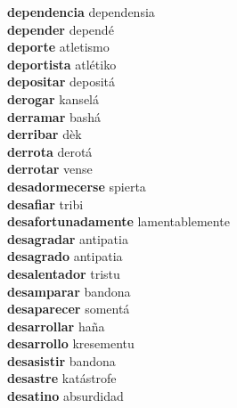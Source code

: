\textbf{dependencia } dependensia \\
\textbf{depender } dependé \\
\textbf{deporte } atletismo \\
\textbf{deportista } atlétiko \\
\textbf{depositar } depositá \\
\textbf{derogar } kanselá \\
\textbf{derramar } bashá \\
\textbf{derribar } dèk \\
\textbf{derrota } derotá \\
\textbf{derrotar } vense \\
\textbf{desadormecerse } spierta \\
\textbf{desafiar } tribi \\
\textbf{desafortunadamente } lamentablemente \\
\textbf{desagradar } antipatia \\
\textbf{desagrado } antipatia \\
\textbf{desalentador } tristu \\
\textbf{desamparar } bandona \\
\textbf{desaparecer } somentá \\
\textbf{desarrollar } haña \\
\textbf{desarrollo } kresementu \\
\textbf{desasistir } bandona \\
\textbf{desastre } katástrofe \\
\textbf{desatino } absurdidad \\
